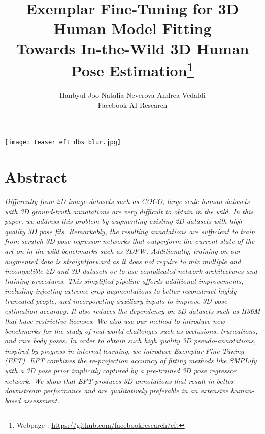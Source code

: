 \documentclass[10pt,twocolumn,letterpaper]{article}
\title{Exemplar Fine-Tuning for 3D Human Model Fitting \\Towards In-the-Wild 3D Human Pose Estimation\thanks{Webpage
		: \url{https://github.com/facebookresearch/eft}}}
\author{Hanbyul Joo
	\hspace{0.3in} Natalia Neverova
	\hspace{0.3in} Andrea Vedaldi
	\vspace{5pt}
	\\
	{Facebook AI Research}
}
\begin{document}
	\maketitle
	\thispagestyle{empty}


	
	
	\begin{strip}
		\vspace{-3em}
		\captionsetup{type=figure} \begin{center}
			\texttt{[image: teaser\_eft\_dbs\_blur.jpg]}
			\label{fig:eft_teaser}
		\end{center}
	\end{strip}
	
	
	\section*{\hspace*{\fill}Abstract\hspace*{\fill}}\label{sec:abstract}
	
	\textit{Differently from 2D image datasets such as COCO, large-scale human datasets with 3D ground-truth annotations are very difficult to obtain in the wild.
		In this paper, we address this problem by \emph{augmenting} existing 2D datasets with high-quality 3D pose fits.
		Remarkably, the resulting annotations are sufficient to train from scratch 3D pose regressor networks that outperform the current state-of-the-art on in-the-wild benchmarks such as 3DPW\@.
Additionally, training on our augmented data is straightforward as it does not require to mix multiple and incompatible 2D and 3D datasets or to use complicated network architectures and training procedures.
This simplified pipeline affords additional improvements, including injecting extreme crop augmentations to better reconstruct highly truncated people, and incorporating auxiliary inputs to improve 3D pose estimation accuracy.
		It also reduces the dependency on 3D datasets such as H36M that have restrictive licenses.
We also use our method to introduce new benchmarks for the study of real-world challenges such as occlusions, truncations, and rare body poses.
In order to obtain such high quality 3D pseudo-annotations, inspired by progress in internal learning, we introduce Exemplar Fine-Tuning (EFT).
		EFT combines the re-projection accuracy of fitting methods like SMPLify with a 3D pose prior implicitly captured by a pre-trained 3D pose regressor network.
		We show that EFT produces 3D annotations that result in better downstream performance and are qualitatively preferable in an extensive human-based assessment. }
\end{document}
